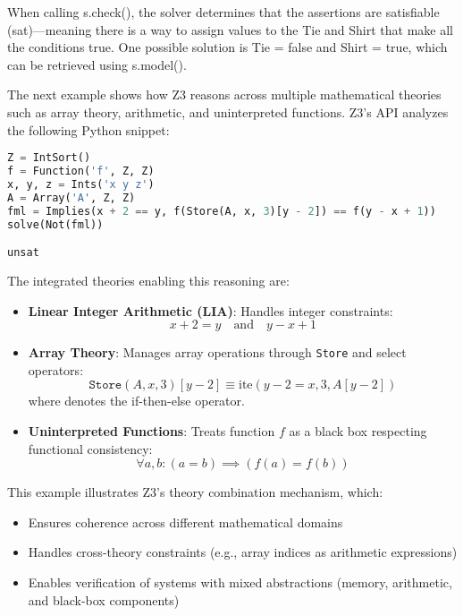 \documentclass[]{rptuseminar}
\begin{document}
When calling s.check(), the solver determines that the assertions are satisfiable
 (sat)—meaning there is a way to assign values to the Tie and Shirt that make all the 
conditions true. One possible solution is Tie = false and Shirt = true, which can be retrieved using s.model().
\vspace{1em}



The next example shows how Z3 reasons across multiple mathematical theories such as array theory, arithmetic, and uninterpreted functions. Z3's API analyzes the following Python snippet:


\begin{lstlisting}[language=Python]
Z = IntSort()
f = Function('f', Z, Z)
x, y, z = Ints('x y z')
A = Array('A', Z, Z)
fml = Implies(x + 2 == y, f(Store(A, x, 3)[y - 2]) == f(y - x + 1))
solve(Not(fml))

unsat
\end{lstlisting}

\vspace{1em}


The integrated theories enabling this reasoning are:

\begin{itemize}
    \item \textbf{Linear Integer Arithmetic (LIA)}: Handles integer constraints:
    \begin{equation*}
        x + 2 = y \quad \text{and} \quad y - x + 1
    \end{equation*}
    
    \item \textbf{Array Theory}: Manages array operations through \texttt{Store} and select operators:
    \begin{equation*}
        \texttt{Store}(A, x, 3)[y - 2] \equiv \text{ite}(y - 2 = x, 3, A[y - 2])
    \end{equation*}
    where  denotes the if-then-else operator.
    
    \item \textbf{Uninterpreted Functions}: Treats function $f$ as a black box respecting functional consistency:
    \begin{equation*}
        \forall a, b: (a = b) \implies (f(a) = f(b))
    \end{equation*}
\end{itemize}

This example illustrates Z3's theory combination mechanism, which:
\begin{itemize}
    \item Ensures coherence across different mathematical domains
    \item Handles cross-theory constraints (e.g., array indices as arithmetic expressions)
    \item Enables verification of systems with mixed abstractions (memory, arithmetic, and black-box components)
\end{itemize}
\end{document}
